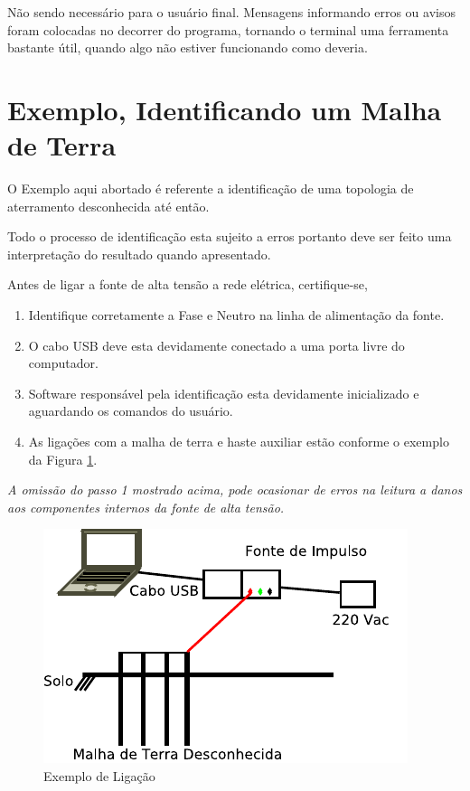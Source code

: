 \documentclass[a4paper, 10pt]{article}
\begin{document}
Não sendo necessário para o usuário final. Mensagens informando erros ou avisos
foram colocadas no decorrer do programa, tornando o terminal uma ferramenta bastante útil, 
quando algo não estiver funcionando como deveria.

\section{Exemplo, Identificando um Malha de Terra}

O Exemplo aqui abortado é referente a identificação de uma topologia de aterramento
desconhecida até então.

Todo o processo de identificação esta sujeito a erros portanto deve ser feito uma 
interpretação do resultado quando apresentado.

Antes de ligar a fonte de alta tensão a rede elétrica, certifique-se,

\begin{enumerate}
    \item Identifique corretamente a Fase e Neutro na linha de alimentação da fonte.
    \item O cabo USB deve esta devidamente conectado a uma porta livre do computador.
    \item Software responsável pela identificação esta devidamente inicializado e aguardando
        os comandos do usuário.
    \item As ligações com a malha de terra e haste auxiliar estão conforme o exemplo da Figura \ref{fig_ligacao_hastes}.

\end{enumerate}

\textit{A omissão do passo 1 mostrado acima, pode ocasionar de erros na leitura a 
danos aos componentes internos da fonte de alta tensão.}

\begin{figure}[H]
        \caption{\label{fig_ligacao_hastes}Exemplo de Ligação}
	    \begin{center}
            \includegraphics[scale=1.2]{../fotos/conexoes/hastes.pdf}
	    \end{center}
\end{figure}
\end{document}
